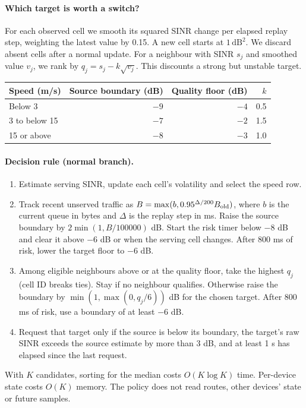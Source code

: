 \documentclass[11pt,a4paper]{article}
\begin{document}
\paragraph{Which target is worth a switch?}
For each observed cell we smooth its squared SINR change per elapsed replay step, weighting the latest value by 0.15. A new cell starts at $1\,\mathrm{dB}^2$. We discard absent cells after a normal update. For a neighbour with SINR $s_j$ and smoothed value $v_j$, we rank by $q_j=s_j-k\sqrt{v_j}$. This discounts a strong but unstable target.
\begin{center}\begin{tabular}{lrrr}\toprule
Speed (m/s)&Source boundary (dB)&Quality floor (dB)&$k$\\\midrule
Below 3&$-9$&$-4$&0.5\\
3 to below 15&$-7$&$-2$&1.5\\
15 or above&$-8$&$-3$&1.0\\\bottomrule
\end{tabular}\end{center}
\newpage
\paragraph{Decision rule (normal branch).}
\begin{enumerate}\setlength\itemsep{1pt}
\item Estimate serving SINR, update each cell's volatility and select the speed row.
\item Track recent unserved traffic as $B=\max(b,0.95^{\Delta/200}B_{\rm old})$, where $b$ is the current queue in bytes and $\Delta$ is the replay step in ms. Raise the source boundary by $2\min(1,B/100000)$ dB. Start the risk timer below $-8$ dB and clear it above $-6$ dB or when the serving cell changes. After 800 ms of risk, lower the target floor to $-6$ dB.
\item Among eligible neighbours above or at the quality floor, take the highest $q_j$ (cell ID breaks ties). Stay if no neighbour qualifies. Otherwise raise the boundary by $\min(1,\max(0,q_j/6))$ dB for the chosen target. After 800 ms of risk, use a boundary of at least $-6$ dB.
\item Request that target only if the source is below its boundary, the target's raw SINR exceeds the source estimate by more than 3 dB, and at least 1 s has elapsed since the last request.
\end{enumerate}
With $K$ candidates, sorting for the median costs $O(K\log K)$ time. Per-device state costs $O(K)$ memory. The policy does not read routes, other devices' state or future samples.
\end{document}
